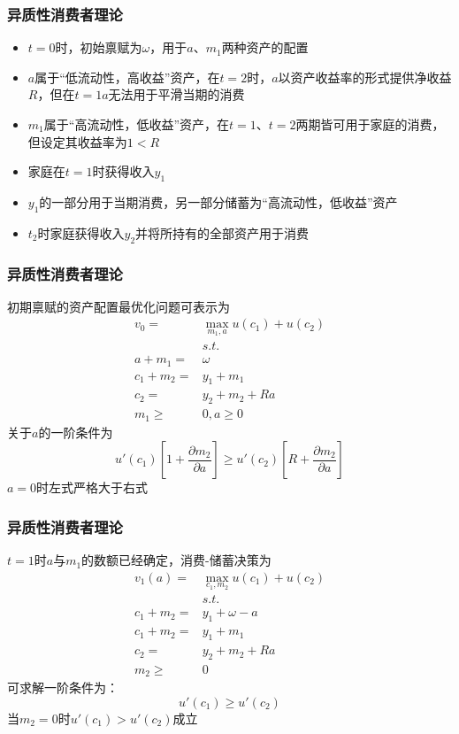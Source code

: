 \documentclass{beamer}
\begin{document}
\begin{frame}
\frametitle{异质性消费者理论}
\begin{itemize}
\item $t=0$时，初始禀赋为$\omega$，用于$a$、$m_1$两种资产的配置
\item $a$属于“低流动性，高收益”资产，在$t=2$时，$a$以资产收益率的形式提供净收益$R$，但在$t=1$$a$无法用于平滑当期的消费
\item $m_1$属于“高流动性，低收益”资产，在$t=1$、$t=2$两期皆可用于家庭的消费，但设定其收益率为$1<R$
\item 家庭在$t=1$时获得收入$y_1$
\item $y_1$的一部分用于当期消费，另一部分储蓄为“高流动性，低收益”资产
\item $t_2$时家庭获得收入$y_2$并将所持有的全部资产用于消费
\end{itemize}
\end{frame}

\begin{frame}
\frametitle{异质性消费者理论}
初期禀赋的资产配置最优化问题可表示为
\begin{align*} 
v_0= & \max_{m_1,a} u(c_1)+u(c_2)\\
& s.t.\\
a+m_1= & \omega\\
c_1+m_2= & y_1+m_1\\
c_2= & y_2+m_2+Ra\\
m_1 \geq & 0,a \geq 0 
\end{align*}  
关于$a$的一阶条件为
\begin{equation*}
u'(c_1)[1+\frac{\partial m_2}{\partial a}] \geq u'(c_2)[R+\frac{\partial m_2}{\partial a}]
\end{equation*}
$a=0$时左式严格大于右式
\end{frame}

\begin{frame}
\frametitle{异质性消费者理论}
$t=1$时$a$与$m_1$的数额已经确定，消费-储蓄决策为
\begin{align*} 
v_1(a)= & \max_{c_1,m_2} u(c_1)+u(c_2)\\
& s.t.\\
c_1+m_2= & y_1+\omega-a\\
c_1+m_2= & y_1+m_1\\
c_2= & y_2+m_2+Ra\\
m_2 \geq & 0
\end{align*}
可求解一阶条件为：
\begin{equation*}
u'(c_1) \geq u'(c_2)
\end{equation*}
当$m_2=0$时$u'(c_1)>u'(c_2)$成立
\end{frame}
\end{document}
